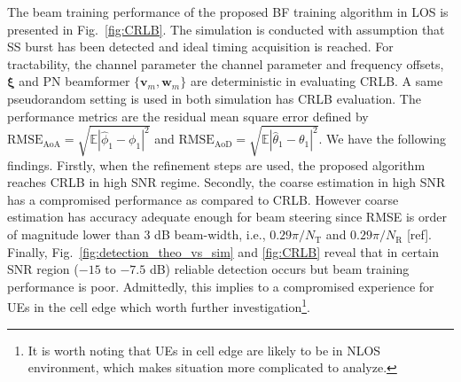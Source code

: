 \documentclass[journal]{IEEEtran}
\newcommand{\tx}[0]{\text{T}}
\newcommand{\rx}[0]{\text{R}}
\begin{document}

% 
%

The beam training performance of the proposed BF training algorithm in LOS is presented in Fig.~\ref{fig:CRLB}. The simulation is conducted with assumption that SS burst has been detected and ideal timing acquisition is reached. For tractability, the channel parameter the channel parameter and frequency offsets, $\boldsymbol{\xi}$ and PN beamformer $\{\mathbf{v}_m,\mathbf{w}_m\}$ are deterministic in evaluating CRLB. A same pseudorandom setting is used in both simulation has CRLB evaluation. The performance metrics are the residual mean square error defined by $\text{RMSE}_{\text{AoA}} = \sqrt{\mathbb{E}|\hat{\phi}_1-\phi_1|^2}$ and $\text{RMSE}_{\text{AoD}} = \sqrt{\mathbb{E}|\hat{\theta}_1-\theta_1|^2}$. We have the following findings. Firstly, when the refinement steps are used, the proposed algorithm reaches CRLB in high SNR regime. Secondly, the coarse estimation in high SNR has a compromised performance as compared to CRLB. However coarse estimation has accuracy adequate enough for beam steering since RMSE is order of magnitude lower than $3$ dB beam-width, i.e., $0.29\pi/N_{\tx}$ and $0.29\pi/N_{\rx}$ \color{red}[ref]\color{black}. Finally, Fig.~\ref{fig:detection_theo_vs_sim} and \ref{fig:CRLB} reveal that in certain SNR region ($-15$ to $-7.5$ dB) reliable detection occurs but beam training performance is poor. Admittedly, this implies to a compromised experience for UEs in the cell edge which worth further investigation\footnote{It is worth noting that UEs in cell edge are likely to be in NLOS environment, which makes situation more complicated to analyze.}. 
\end{document}
